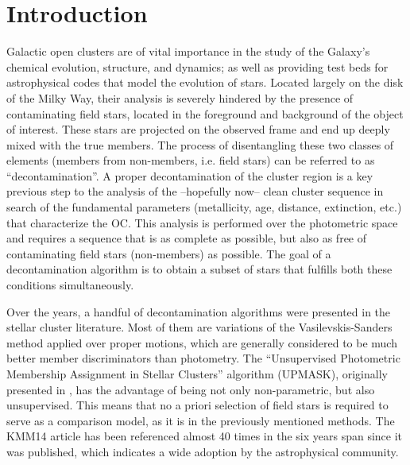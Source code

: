 \documentclass[draft]{aa}
\begin{document}

\maketitle



\section{Introduction}
 \label{sec:intro}

 Galactic open clusters are of vital importance in the study of the
 Galaxy's chemical evolution, structure, and dynamics; as well as providing
 test beds for astrophysical codes that model the evolution of stars.
 Located largely on the disk of the Milky Way, their analysis is severely
 hindered by the presence of contaminating field stars, located in the
 foreground and background of the object of interest. These stars are
 projected on the observed frame and end up deeply mixed
 with the true members. The process of disentangling these two classes of
 elements (members from non-members, i.e. field stars) can be referred
 to as ``decontamination''.
 A proper decontamination of the cluster region is a key previous step to the
 analysis of the --hopefully now-- clean cluster sequence in search of the
 fundamental parameters (metallicity, age, distance, extinction, etc.) that
 characterize the OC. This analysis is performed over the photometric space
 and requires a sequence that is as
 complete as possible, but also as free of contaminating field stars 
 (non-members) as possible. The goal of a decontamination algorithm is to
 obtain a subset of stars that fulfills both these conditions simultaneously.

 Over the years, a handful of decontamination algorithms were presented in the
 stellar cluster literature. Most of them are variations of the
 Vasilevskis-Sanders method \citep{Vasilevskis_1958,Sanders_1971} applied over
 proper motions, which are generally considered to be much better member
 discriminators than photometry.
 The ``Unsupervised Photometric Membership Assignment in Stellar Clusters''
 algorithm (UPMASK), originally presented in \citet[][henceforth KMM14]{KMM14},
 has the advantage of being not only non-parametric, but also unsupervised.
 This means that no a priori selection of field stars is required to serve as a
 comparison model, as it is in the previously mentioned methods.
 The KMM14 article has been referenced almost 40 times in the six years span
 since it was published, which indicates a wide adoption by the astrophysical
 community.
\end{document}

